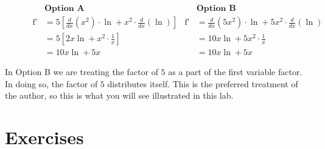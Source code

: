 \documentclass[12pt,]{book}
\theoremstyle{plain}
\theoremstyle{definition}
\numberwithin{equation}{section}
\newcommand{\fe}[2]{\mathop{{#1}{\left(#2\right)}}}
\newcommand{\fd}[1]{#1'}
\newcommand{\lzoo}[2]{{\frac{d}{d#1}}{\left(#2\right)}}
\begin{document}
\begin{figure}
\centering
\begin{align*}
&\textbf{Option A}&&\textbf{Option B}\\
\fe{\fd{f}}{x}&=5\left[\lzoo{x}{x^2}\cdot\fe{\ln}{x}+x^2\cdot\lzoo{x}{\fe{\ln}{x}}\right]&\fe{\fd{f}}{x}&=\lzoo{x}{5x^2}\cdot\fe{\ln}{x}+5x^2\cdot\lzoo{x}{\fe{\ln}{x}}\\
&=5\left[2x\fe{\ln}{x}+x^2\cdot\frac{1}{x}\right]&&=10x\fe{\ln}{x}+5x^2\cdot\frac{1}{x}\\
&=10x\fe{\ln}{x}+5x&&=10x\fe{\ln}{x}+5x
\end{align*}%
\caption{\label{figure-constant-factors-with-product-rule}}
\end{figure}
\par
In Option B we are treating the factor of \(5\) as a part of the first variable factor.  In doing so, the factor of \(5\) distributes itself.  This is the preferred treatment of the author, so this is what you will see illustrated in this lab.%
\typeout{************************************************}
\typeout{************************************************}
\section*{Exercises}\label{exercises-35}
\end{document}
